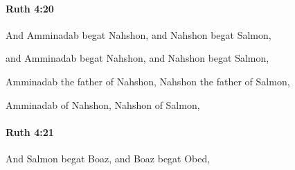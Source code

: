 		\paragraph{Ruth 4:20} %
			\label{RUTH-4-20}

			And Amminadab begat Nahshon, and Nahshon begat Salmon,

			\begin{versebox}
					\item[BHS] 
					\item[LXX] 
					\item[ASV] and Amminadab begat Nahshon, and Nahshon begat Salmon,
					\item[NIV] Amminadab the father of Nahshon, Nahshon the father of Salmon,
					\item[NRSV] Amminadab of Nahshon, Nahshon of Salmon,
			\end{versebox}

		\paragraph{Ruth 4:21} %
			\label{RUTH-4-21}

			And Salmon begat Boaz, and Boaz begat Obed,

